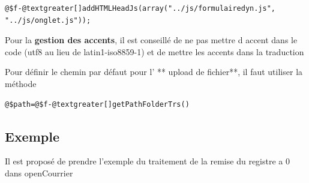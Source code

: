 \documentclass[letterpaper,10pt,french]{manual}
\begin{document}
\begin{Verbatim}[commandchars=@\[\]]
@$f-@textgreater[]addHTMLHeadJs(array("../js/formulairedyn.js", "../js/onglet.js"));
\end{Verbatim}

Pour la \textbf{gestion des accents}, il est conseillé de ne pas mettre d accent dans
le code (utf8 au lieu de latin1-iso8859-1) et de mettre les accents dans la traduction

Pour définir le chemin par défaut pour l' ** upload de fichier**, il faut utiliser la méthode

\begin{Verbatim}[commandchars=@\[\]]
@$path=@$f-@textgreater[]getPathFolderTrs()
\end{Verbatim}


\subsection{Exemple}

Il est proposé de prendre l'exemple du traitement de la remise du registre
a 0 dans openCourrier
\end{document}

